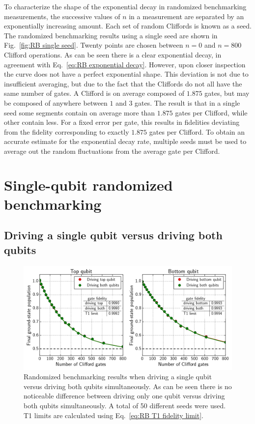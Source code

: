       To characterize the shape of the exponential decay in randomized benchmarking measurements, the successive values of $n$ in a measurement are separated by an exponentially increasing amount. Each set of random Cliffords is known as a seed. The randomized benchmarking results using a single seed are shown in Fig.~\ref{fig:RB single seed}. Twenty points are chosen between $n=0$ and $n=800$ Clifford operations. As can be seen there is a clear exponential decay, in agreement with Eq.~\ref{eq:RB exponential decay}. However, upon closer inspection the curve does not have a perfect exponential shape. This deviation is not due to insufficient averaging, but due to the fact that the Cliffords do not all have the same number of gates. A Clifford is on average composed of $1.875$ gates, but may be composed of anywhere between $1$ and $3$ gates. The result is that in a single seed some segments contain on average more than $1.875$ gates per Clifford, while other contain less. For a fixed error per gate, this results in fidelities deviating from the fidelity corresponding to exactly $1.875$ gates per Clifford. To obtain an accurate estimate for the exponential decay rate, multiple seeds must be used to average out the random fluctuations from the average gate per Clifford.

    \section{Single-qubit randomized benchmarking}
      \label{sec:Single-qubit randomized benchmarking}
      \subsection{Driving a single qubit versus driving both qubits}
        \label{ssec:Driving a single qubit versus driving both qubits}

        \begin{figure}[tb]
          \centering
          \includegraphics[width=\textwidth]{Figures/Randomized benchmarking/RB_normal_driving_single_both.png}
          \caption{Randomized benchmarking results when driving a single qubit versus driving both qubits simultaneously. As can be seen there is no noticeable difference between driving only one qubit versus driving both qubits simultaneously. A total of 50 different seeds were used. T1 limits are calculated using Eq.~\ref{eq:RB T1 fidelity limit}.}
          \label{fig:RB normal single vs both}
        \end{figure}

